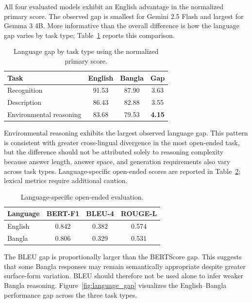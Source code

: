 \documentclass{article}
\begin{document}
All four evaluated models exhibit an English advantage in the normalized primary score. The observed gap is smallest for Gemini 2.5 Flash and largest for Gemma 3 4B. More informative than the overall difference is how the language gap varies by task type; Table~\ref{tab:language_task_gap} reports this comparison.
\begin{table}[t]
\centering
\caption{Language gap by task type using the normalized primary score.}
\label{tab:language_task_gap}
\begin{tabular}{lccc}
\toprule
\textbf{Task}
& \textbf{English}
& \textbf{Bangla}
& \textbf{Gap} \\
\midrule
Recognition
& 91.53
& 87.90
& 3.63 \\

Description
& 86.43
& 82.88
& 3.55 \\

Environmental reasoning
& 83.68
& 79.53
& \textbf{4.15} \\
\bottomrule
\end{tabular}
\end{table}

Environmental reasoning exhibits the largest observed language gap. This pattern is consistent with greater cross-lingual divergence in the most open-ended task, but the difference should not be attributed solely to reasoning complexity because answer length, answer space, and generation requirements also vary across task types. Language-specific open-ended scores are reported in Table~\ref{tab:language_generation_metrics}; lexical metrics require additional caution.

\begin{table}[t]
\centering
\caption{Language-specific open-ended evaluation. }
\label{tab:language_generation_metrics}
\begin{tabular}{lccc}
\toprule
\textbf{Language}
& \textbf{BERT-F1}
& \textbf{BLEU-4}
& \textbf{ROUGE-L} \\
\midrule
English
& 0.842
& 0.382
& 0.574 \\

Bangla
& 0.806
& 0.329
& 0.531 \\
\bottomrule
\end{tabular}
\end{table}

The BLEU gap is proportionally larger than the BERTScore gap. This suggests that some Bangla responses may remain semantically appropriate despite greater surface-form variation. BLEU should therefore not be used alone to infer weaker Bangla reasoning. Figure~\ref{fig:language_gap} visualizes the English--Bangla performance gap across the three task types.
\end{document}
